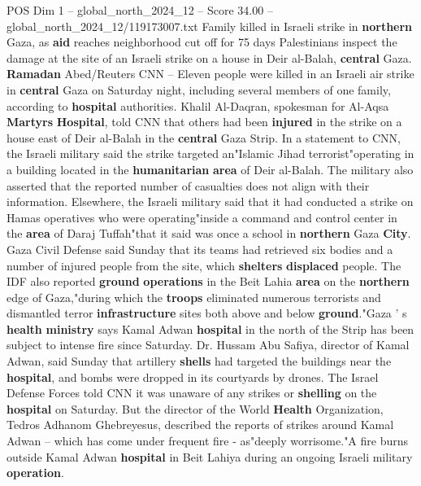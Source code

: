 \begin{textsample}{POS Dim 1 – global\_north\_2024\_12 – Score 34.00 – global\_north\_2024\_12/119173007.txt}  \label{ex:f1_pos_229}
Family killed in Israeli strike in \textbf{northern} Gaza, as \textbf{aid} reaches neighborhood cut off for 75 days Palestinians inspect the damage at the site of an Israeli strike on a house in Deir al-Balah, \textbf{central} Gaza. \textbf{Ramadan} Abed/Reuters CNN -- Eleven people were killed in an Israeli air strike in \textbf{central} Gaza on Saturday night, including several members of one family, according to \textbf{hospital} authorities.
Khalil Al-Daqran, spokesman for Al-Aqsa \textbf{Martyrs} \textbf{Hospital}, told CNN that others had been \textbf{injured} in the strike on a house east of Deir al-Balah in the \textbf{central} Gaza Strip.
In a statement to CNN, the Israeli military said the strike targeted an"Islamic Jihad terrorist"operating in a building located in the \textbf{humanitarian} \textbf{area} of Deir al-Balah.
The military also asserted that the reported number of casualties does not align with their information.
Elsewhere, the Israeli military said that it had conducted a strike on Hamas operatives who were operating"inside a command and control center in the \textbf{area} of Daraj Tuffah"that it said was once a school in \textbf{northern} Gaza \textbf{City}.
Gaza Civil Defense said Sunday that its teams had retrieved six bodies and a number of injured people from the site, which \textbf{shelters} \textbf{displaced} people.
The IDF also reported \textbf{ground} \textbf{operations} in the Beit Lahia \textbf{area} on the \textbf{northern} edge of Gaza,"during which the \textbf{troops} eliminated numerous terrorists and dismantled terror \textbf{infrastructure} sites both above and below \textbf{ground}."Gaza ' s \textbf{health} \textbf{ministry} says Kamal Adwan \textbf{hospital} in the north of the Strip has been subject to intense fire since Saturday.
Dr.
Hussam Abu Safiya, director of Kamal Adwan, said Sunday that artillery \textbf{shells} had targeted the buildings near the \textbf{hospital}, and bombs were dropped in its courtyards by drones.
The Israel Defense Forces told CNN it was unaware of any strikes or \textbf{shelling} on the \textbf{hospital} on Saturday.
But the director of the World \textbf{Health} Organization, Tedros Adhanom Ghebreyesus, described the reports of strikes around Kamal Adwan -- which has come under frequent fire - as"deeply worrisome."A fire burns outside Kamal Adwan \textbf{hospital} in Beit Lahiya during an ongoing Israeli military \textbf{operation}.

\end{textsample}
